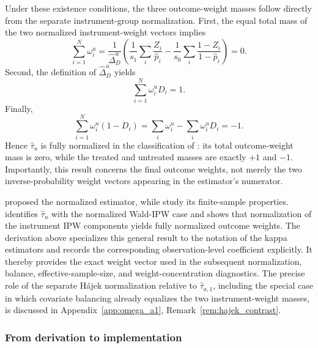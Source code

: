 \documentclass[12pt, a4paper, oneside]{article}
\theoremstyle{plain}
\theoremstyle{definition}
\begin{document}
Under these existence conditions, the three outcome-weight masses follow
directly from the separate instrument-group normalization. First,
the equal total mass of the two normalized instrument-weight vectors implies
\begin{equation}
    \sum_{i=1}^{N}\omega_i^u
    =\frac{1}{\widehat\Delta_D^u}
      \left(\frac{1}{s_1}\sum_i\frac{Z_i}{\widehat p_i}
            -\frac{1}{s_0}\sum_i\frac{1-Z_i}{1-\widehat p_i}\right)
    =0.
    \label{eq:u_omega_sum}
\end{equation}
Second, the definition of \(\widehat\Delta_D^u\) yields
\begin{equation}
    \sum_{i=1}^{N}\omega_i^uD_i=1.
    \label{eq:u_omega_treated_sum}
\end{equation}
Finally,
\begin{equation}
    \sum_{i=1}^{N}\omega_i^u(1-D_i)
    =\sum_i\omega_i^u-\sum_i\omega_i^uD_i=-1.
    \label{eq:u_omega_untreated_sum}
\end{equation}
Hence \(\widehat\tau_u\) is fully normalized in the classification of
\citet{knaus2024treatment}: its total outcome-weight mass is zero, while the
treated and untreated masses are exactly \(+1\) and \(-1\). Importantly, this
result concerns the final outcome weights, not merely the two inverse-probability
weight vectors appearing in the estimator's numerator.

\citet{uysal2011three} proposed the normalized estimator, while
\citet{sloczynski2025abadie} study its finite-sample properties.
\citet[Table~3, Section~4.2.4, and Appendix~A.4]{knaus2024treatment}
identifies \(\widehat\tau_u\) with the normalized Wald-IPW case and shows that
normalization of the instrument IPW components yields fully normalized outcome
weights. The derivation above specializes this general result to the notation
of the kappa estimators and records the corresponding observation-level
coefficient explicitly. It thereby provides the exact weight vector used in
the subsequent normalization, balance, effective-sample-size, and
weight-concentration diagnostics.
The precise role of the separate H\'ajek normalization relative to
\(\widehat\tau_{a,1}\), including the special case in which covariate
balancing already equalizes the two instrument-weight masses, is discussed in
Appendix~\ref{app:omega_a1}, Remark~\ref{rem:hajek_contrast}.


\subsubsection{From derivation to implementation}
\label{subsubsec:weight_implementation}
\end{document}

